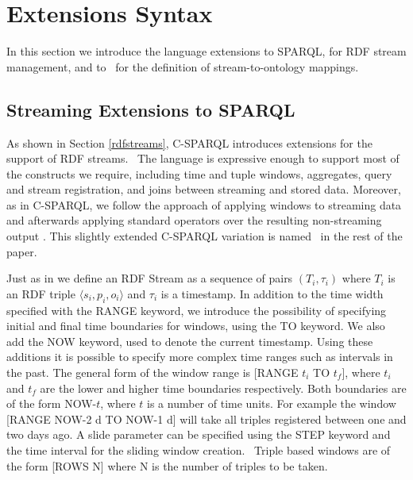 \section{Extensions Syntax}
\label{syntax}

In this section we introduce the language extensions to SPARQL, for RDF stream management, and to \rtwoo\, for the
definition of stream-to-ontology mappings.

\subsection{Streaming Extensions to SPARQL}
\label{streamingsparqlsyntax}

As shown in Section \ref{rdfstreams}, C-SPARQL introduces extensions for the support of RDF streams.\ %
The language is expressive enough to support most of the constructs we require, including time and tuple windows,
aggregates, query and stream registration, and joins between streaming and stored data. Moreover, as in C-SPARQL, we
follow the approach of applying windows to streaming data and afterwards applying standard operators over the resulting
non-streaming output \cite{DellaValle_09}. This slightly extended C-SPARQL variation is named \sparqlstr\ in the rest
of the paper.

Just as in \cite{Barbieri_2010} we define an RDF Stream as a sequence of pairs $(T_i,\tau_i)$ where $T_i$ is an RDF
triple $\langle s_i,p_i,o_i \rangle$ and $\tau_i$ is a timestamp.
In addition to the time width specified with the \textsf{RANGE} keyword, we introduce the possibility of specifying initial and final time boundaries for windows, using the \textsf{TO} keyword. We also add the \textsf{NOW} keyword, used to denote the current timestamp. Using these additions it is possible to specify more complex time ranges such as intervals in the past. The general form of the window range is \textsf{[RANGE $t_i$ TO $t_f$]}, where $t_i$ and $t_f$ are the lower and higher time boundaries respectively. Both boundaries are of the form \textsf{NOW-}$t$, where $t$ is a number of time units. For example the window \textsf{[RANGE NOW-2 d TO NOW-1 d]} will take all triples registered between one and two days ago. %
A slide parameter can be specified using the \textsf{STEP} keyword and the time interval for the sliding window creation.\ %
Triple based windows are of the form \textsf{[ROWS N]} where \textsf{N} is the number of triples to be taken.

